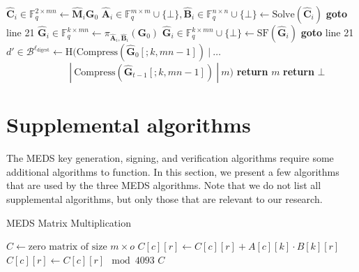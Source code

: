 \begin{algorithm}[H]
\begin{algorithmic}[1]
        \State $\hat{\textbf{C}}_i \in \mathds{F}_q^{2 \times mn} \gets \hat{\textbf{M}}_i \textbf{G}_0$
        \State $\hat{\textbf{A}}_i \in \mathds{F}_q^{m \times m} \cup \{\bot\}, \hat{\textbf{B}}_i \in \mathds{F}_q^{n \times n} \cup \{\bot\} \gets \text{Solve}(\hat{\textbf{C}}_i)$
            \State \textbf{goto} line 21
        \EndIf
        \State $\hat{\textbf{G}}_i \in \mathds{F}_q^{k \times mn} \gets \pi_{\hat{\textbf{A}}_i, \hat{\textbf{B}}_i}(\textbf{G}_0)$
        \State $\hat{\textbf{G}}_i \in \mathds{F}_q^{k \times mn} \cup \{\bot\} \gets \text{SF}(\hat{\textbf{G}}_i)$
            \State \textbf{goto} line 21
        \EndIf
    \EndIf
\EndFor
\State $d' \in \mathcal{B}^{\ell_\text{digest}} \gets \text{H}(\text{Compress}(\hat{\textbf{G}}_0[;k,mn-1])~|~\ldots$\\
$\quad\quad\quad\quad\quad\quad~~|~\text{Compress}(\hat{\textbf{G}}_{t-1}[;k,mn-1])~|~m)$
    \State \textbf{return} $m$
\Else
    \State \textbf{return} $\bot$
\EndIf
\end{algorithmic}
\end{algorithm}

\section{Supplemental algorithms}
\label{app:supplementalalgs}
The MEDS key generation, signing, and verification algorithms require some additional algorithms to function. In this section, we present a few algorithms that are used by the three MEDS algorithms. Note that we do not list all supplemental algorithms, but only those that are relevant to our research.

\begin{algorithm}
  \caption{MEDS Matrix Multiplication}
  \label{alg:medsmatrixmultiplication}
  \begin{algorithmic}
      \State $C \gets \text{zero matrix of size } m \times o$
            \State $C[c][r] \gets C[c][r] + A[c][k] \cdot B[k][r]$
          \EndFor
          \State $C[c][r] \gets C[c][r] \mod 4093$
        \EndFor
      \EndFor
      \State \Return $C$
    \EndFunction
  \end{algorithmic}
\end{algorithm}

